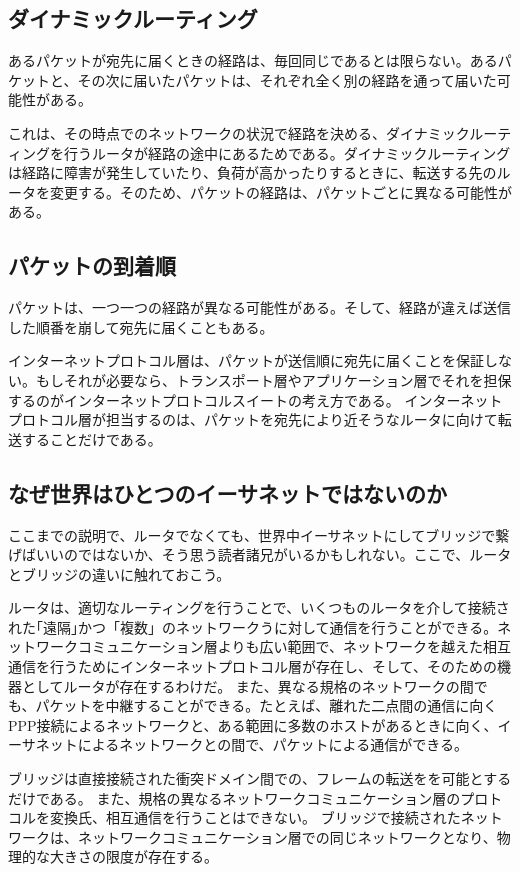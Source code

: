 \subsection{ダイナミックルーティング}

あるパケットが宛先に届くときの経路は、毎回同じであるとは限らない。あるパケットと、その次に届いたパケットは、それぞれ全く別の経路を通って届いた可能性がある。

これは、その時点でのネットワークの状況で経路を決める、ダイナミックルーティングを行うルータが経路の途中にあるためである。ダイナミックルーティングは経路に障害が発生していたり、負荷が高かったりするときに、転送する先のルータを変更する。そのため、パケットの経路は、パケットごとに異なる可能性がある。

\subsection{パケットの到着順}
パケットは、一つ一つの経路が異なる可能性がある。そして、経路が違えば送信した順番を崩して宛先に届くこともある。

インターネットプロトコル層は、パケットが送信順に宛先に届くことを保証しない。もしそれが必要なら、トランスポート層やアプリケーション層でそれを担保するのがインターネットプロトコルスイートの考え方である。
インターネットプロトコル層が担当するのは、パケットを宛先により近そうなルータに向けて転送することだけである。


\subsection{なぜ世界はひとつのイーサネットではないのか}

ここまでの説明で、ルータでなくても、世界中イーサネットにしてブリッジで繋げばいいのではないか、そう思う読者諸兄がいるかもしれない。ここで、ルータとブリッジの違いに触れておこう。

ルータは、適切なルーティングを行うことで、いくつものルータを介して接続された｢遠隔｣かつ「複数」のネットワークうに対して通信を行うことができる。ネットワークコミュニケーション層よりも広い範囲で、ネットワークを越えた相互通信を行うためにインターネットプロトコル層が存在し、そして、そのための機器としてルータが存在するわけだ。
また、異なる規格のネットワークの間でも、パケットを中継することができる。たとえば、離れた二点間の通信に向くPPP接続によるネットワークと、ある範囲に多数のホストがあるときに向く、イーサネットによるネットワークとの間で、パケットによる通信ができる。

ブリッジは直接接続された衝突ドメイン間での、フレームの転送をを可能とするだけである。
また、規格の異なるネットワークコミュニケーション層のプロトコルを変換氏、相互通信を行うことはできない。
ブリッジで接続されたネットワークは、ネットワークコミュニケーション層での同じネットワークとなり、物理的な大きさの限度が存在する。



